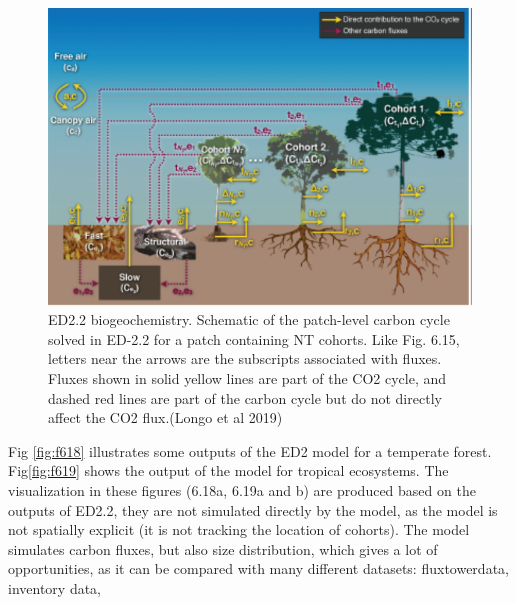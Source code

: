 \documentclass[12pt,oneside]{book}
\begin{document}
\begin{figure}

{\centering \includegraphics[width=0.8\linewidth]{figures/chap6/f617_ED_biogeochemistry} 

}

\caption{ ED2.2 biogeochemistry. Schematic of the patch-level carbon cycle solved in ED-2.2 for a patch containing NT cohorts. Like Fig. 6.15, letters near the arrows are the subscripts associated with fluxes. Fluxes shown in solid yellow lines are part of the CO2 cycle, and dashed red lines are part of the carbon cycle but do not directly affect the CO2 flux.(Longo et al 2019)}\label{fig:f617}
\end{figure}

Fig \ref{fig:f618} illustrates some outputs of the ED2 model for a
temperate forest. Fig\ref{fig:f619} shows the output of the model for
tropical ecosystems. The visualization in these figures (6.18a, 6.19a
and b) are produced based on the outputs of ED2.2, they are not
simulated directly by the model, as the model is not spatially explicit
(it is not tracking the location of cohorts). The model simulates carbon
fluxes, but also size distribution, which gives a lot of opportunities,
as it can be compared with many different datasets: fluxtowerdata,
inventory data,
\end{document}
